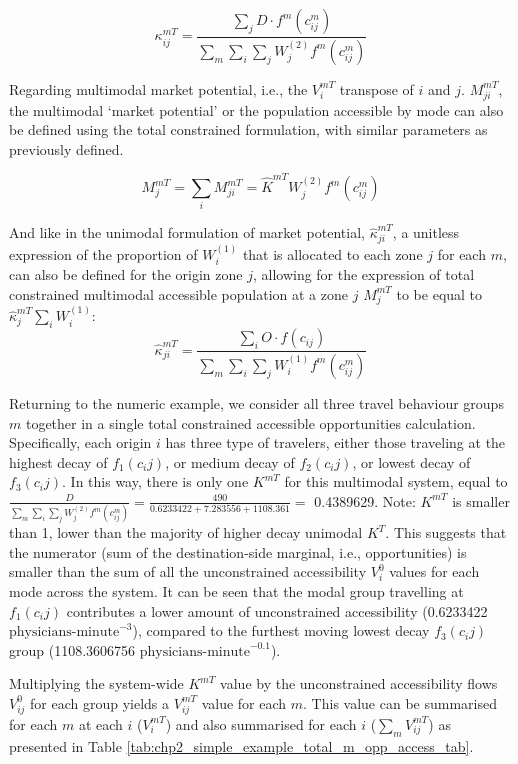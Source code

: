 \documentclass[
11pt, %
oneside, %
english, %
singlespacing, %
]{macthesis} %
\begin{document}
\[
\kappa_{ij}^{mT} = \frac{\sum_j D\cdot f^m(c^m_{ij})}{\sum_m\sum_i\sum_j W^{(2)}_jf^m(c^m_{ij})}
\]

Regarding multimodal market potential, i.e., the \(V_i^{mT}\) transpose of \(i\) and \(j\). \(M^{mT}_{ji}\), the multimodal `market potential' or the population accessible by mode can also be defined using the total constrained formulation, with similar parameters as previously defined.

\begin{equation}
\label{eq:total-constrained-multimodal-market}
M^{mT}_{j} = \sum_i M^{mT}_{ji} = \hat K^{mT} W_j^{(2)} f^m(c^m_{ij})
\end{equation} 

And like in the unimodal formulation of market potential, \(\hat \kappa_{ji}^{mT}\), a unitless expression of the proportion of \(W^{(1)}_i\) that is allocated to each zone \(j\) for each \(m\), can also be defined for the origin zone \(j\), allowing for the expression of total constrained multimodal accessible population at a zone \(j\) \(M^{mT}_j\) to be equal to \(\hat \kappa_j^{mT}\sum_i W^{(1)}_i\):
\[
\hat \kappa_{ji}^{mT} = \frac{\sum_i O \cdot f(c_{ij})}{\sum_m\sum_i\sum_j W^{(1)}_if^m(c^m_{ij})}
\]

Returning to the numeric example, we consider all three travel behaviour groups \(m\) together in a single total constrained accessible opportunities calculation. Specifically, each origin \(i\) has three type of travelers, either those traveling at the highest decay of \(f_1 (c_ij)\), or medium decay of \(f_2(c_ij)\), or lowest decay of \(f_3(c_ij)\). In this way, there is only one \(K^{mT}\) for this multimodal system, equal to \(\frac{D}{\sum_m\sum_i\sum_j W^{(2)}_jf^m(c^m_{ij})} = \frac{490}{0.6233422 + 7.283556 + 1108.361}=\) 0.4389629. Note: \(K^{mT}\) is smaller than 1, lower than the majority of higher decay unimodal \(K^T\). This suggests that the numerator (sum of the destination-side marginal, i.e., opportunities) is smaller than the sum of all the unconstrained accessibility \(V^{0}_i\) values for each mode across the system. It can be seen that the modal group travelling at \(f_1 (c_ij)\) contributes a lower amount of unconstrained accessibility (0.6233422 \emph{\(\text{physicians-minute}^{-3}\)}), compared to the furthest moving lowest decay \(f_3(c_ij)\) group (1108.3606756 \emph{\(\text{physicians-minute}^{-0.1}\)}).

Multiplying the system-wide \(K^{mT}\) value by the unconstrained accessibility flows \(V^{0}_{ij}\) for each group yields a \(V^{mT}_{ij}\) value for each \(m\). This value can be summarised for each \(m\) at each \(i\) (\(V^{mT}_{i}\)) and also summarised for each \(i\) (\(\sum_m V^{mT}_{ij}\)) as presented in Table \ref{tab:chp2_simple_example_total_m_opp_access_tab}.
\end{document}
